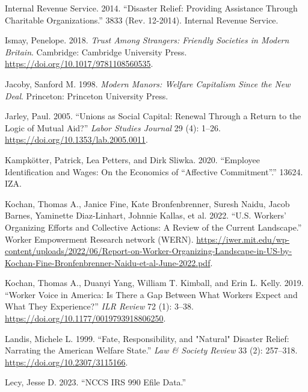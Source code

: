 \documentclass[
  11pt,
  oneside]{article}
\newlength{\cslhangindent}
\newenvironment{CSLReferences}[2] %
 {\begin{list}{}{%
  \setlength{\itemindent}{0pt}
  \setlength{\leftmargin}{0pt}
  \setlength{\parsep}{0pt}
  \ifodd #1
   \setlength{\leftmargin}{\cslhangindent}
   \setlength{\itemindent}{-1\cslhangindent}
  \fi
  \setlength{\itemsep}{#2\baselineskip}}}
 {\end{list}}
\begin{document}
\begin{CSLReferences}{1}{0}
Internal Revenue Service. 2014. {``Disaster {Relief}: Providing Assistance Through Charitable Organizations.''} 3833 (Rev. 12-2014). Internal Revenue Service.

Ismay, Penelope. 2018. \emph{Trust {Among} {Strangers}: {Friendly} {Societies} in {Modern} {Britain}}. Cambridge: Cambridge University Press. \url{https://doi.org/10.1017/9781108560535}.

Jacoby, Sanford M. 1998. \emph{Modern {Manors}: {Welfare Capitalism} Since the {New Deal}}. Princeton: Princeton University Press.

Jarley, Paul. 2005. {``Unions as {Social} {Capital}: {Renewal} Through a {Return} to the {Logic} of {Mutual} {Aid}?''} \emph{Labor Studies Journal} 29 (4): 1--26. \url{https://doi.org/10.1353/lab.2005.0011}.

Kampkötter, Patrick, Lea Petters, and Dirk Sliwka. 2020. {``Employee {Identification} and {Wages}: {On} the {Economics} of {``}{Affective} {Commitment}{''}.''} 13624. IZA.

Kochan, Thomas A., Janice Fine, Kate Bronfenbrenner, Suresh Naidu, Jacob Barnes, Yaminette Diaz-Linhart, Johnnie Kallas, et al. 2022. {``U.{S}. {Workers}{'} {Organizing} {Efforts} and {Collective} {Actions}: {A} {Review} of the {Current} {Landscape}.''} Worker Empowerment Research network (WERN). \url{https://iwer.mit.edu/wp-content/uploads/2022/06/Report-on-Worker-Organizing-Landscape-in-US-by-Kochan-Fine-Bronfenbrenner-Naidu-et-al-June-2022.pdf}.

Kochan, Thomas A., Duanyi Yang, William T. Kimball, and Erin L. Kelly. 2019. {``Worker {Voice} in {America}: {Is} {There} a {Gap} Between {What} {Workers} {Expect} and {What} {They} {Experience}?''} \emph{ILR Review} 72 (1): 3--38. \url{https://doi.org/10.1177/0019793918806250}.

Landis, Michele L. 1999. {``Fate, {Responsibility}, and "{Natural}" {Disaster} {Relief}: {Narrating} the {American} {Welfare} {State}.''} \emph{Law \& Society Review} 33 (2): 257--318. \url{https://doi.org/10.2307/3115166}.

Lecy, Jesse D. 2023. {``{NCCS IRS} 990 {Efile Data}.''}


\end{CSLReferences}
\end{document}
